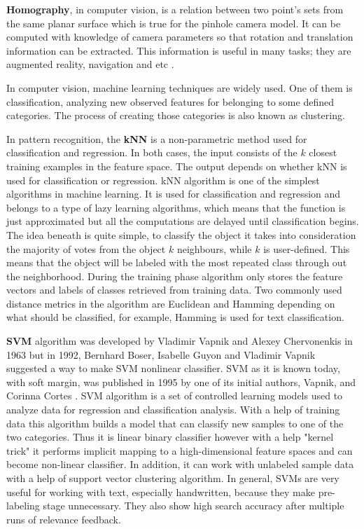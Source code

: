 \documentclass[../../../../main]{subfiles}
\begin{document}
\textbf{Homography}, in computer vision, is a relation between two point's sets from the same planar surface which is true for the pinhole camera model. It can be computed with knowledge of camera parameters so that rotation and translation information can be extracted. This information is useful in many tasks; they are augmented reality, navigation and etc \cite{opencv_docs_feature_matching_homography}.

In computer vision, machine learning techniques are widely used. One of them is classification, analyzing new observed features for belonging to some defined categories. The process of creating those categories is also known as clustering.

In pattern recognition, the \textbf{\ac{kNN}} is a non-parametric method used for classification and regression. In both cases, the input consists of the $k$ closest training examples in the feature space. The output depends on whether \ac{kNN} is used for classification or regression. \ac{kNN} algorithm is one of the simplest algorithms in machine learning. It is used for classification and regression and belongs to a type of lazy learning algorithms, which means that the function is just approximated but all the computations are delayed until classification begins. The idea beneath is quite simple, to classify the object it takes into consideration the majority of votes from the object $k$ neighbours, while $k$ is user-defined. This means that the object will be labeled with the most repeated class through out the neighborhood.
During the training phase algorithm only stores the feature vectors and labels of classes retrieved from training data. 
Two commonly used distance metrics in the algorithm are Euclidean and Hamming depending on what should be classified, for example, Hamming is used for text classification.

\textbf{\ac{SVM}} algorithm was developed by Vladimir Vapnik and Alexey Chervonenkis in 1963 but in 1992, Bernhard Boser, Isabelle Guyon and Vladimir Vapnik suggested a way to make \ac{SVM} nonlinear classifier. \ac{SVM} as it is known today, with soft margin, was published in 1995 by one of its initial authors, Vapnik, and Corinna Cortes \cite{support_vector_networks_vapnik}. \ac{SVM} algorithm is a set of controlled learning models used to analyze data for regression and classification analysis. With a help of training data this algorithm builds a model that can classify new samples to one of the two categories. Thus it is linear binary classifier however with a help "kernel trick" it performs implicit mapping to a high-dimensional feature spaces and can become non-linear classifier. In addition, it can work with unlabeled sample data with a help of support vector clustering algorithm. In general, \ac{SVM}s are very useful for working with text, especially handwritten, because they make pre-labeling stage unnecessary. They also show high search accuracy after multiple runs of relevance feedback.
\end{document}
